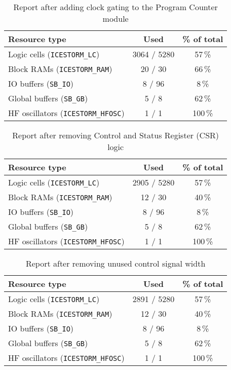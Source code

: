 \documentclass[a4paper,10pt]{article}
\begin{document}
\begin{table}[H] 
    \centering
    \begin{tabularx}{0.65\textwidth}{X c c}
        \toprule
        Resource type & Used & \% of total \\ \midrule
        Logic cells (\texttt{ICESTORM\_LC}) & 3064 / 5280 & 57\,\% \\
        Block RAMs (\texttt{ICESTORM\_RAM}) & 20 / 30 & 66\,\% \\
        IO buffers (\texttt{SB\_IO}) & 8 / 96 & 8\,\% \\
        Global buffers (\texttt{SB\_GB}) & 5 / 8 & 62\,\% \\
        HF oscillators (\texttt{ICESTORM\_HFOSC}) & 1 / 1 & 100\,\% \\
        \bottomrule
    \end{tabularx}
    \caption{Report after adding clock gating to the Program Counter module}
    \label{tab:Program_Counter}
\end{table}

\begin{table}[H] 
    \centering
    \begin{tabularx}{0.65\textwidth}{X c c}
        \toprule
        Resource type & Used & \% of total \\ \midrule
        Logic cells (\texttt{ICESTORM\_LC}) & 2905 / 5280 & 57\,\% \\
        Block RAMs (\texttt{ICESTORM\_RAM}) & 12 / 30 & 40\,\% \\
        IO buffers (\texttt{SB\_IO}) & 8 / 96 & 8\,\% \\
        Global buffers (\texttt{SB\_GB}) & 5 / 8 & 62\,\% \\
        HF oscillators (\texttt{ICESTORM\_HFOSC}) & 1 / 1 & 100\,\% \\
        \bottomrule
    \end{tabularx}
    \caption{Report after removing Control and Status Register (CSR) logic}
    \label{tab:CSR}
\end{table}

\begin{table}[H] 
    \centering
    \begin{tabularx}{0.65\textwidth}{X c c}
        \toprule
        Resource type & Used & \% of total \\ \midrule
        Logic cells (\texttt{ICESTORM\_LC}) & 2891 / 5280 & 57\,\% \\
        Block RAMs (\texttt{ICESTORM\_RAM}) & 12 / 30 & 40\,\% \\
        IO buffers (\texttt{SB\_IO}) & 8 / 96 & 8\,\% \\
        Global buffers (\texttt{SB\_GB}) & 5 / 8 & 62\,\% \\
        HF oscillators (\texttt{ICESTORM\_HFOSC}) & 1 / 1 & 100\,\% \\
        \bottomrule
    \end{tabularx}
    \caption{Report after removing unused control signal width}
    \label{tab:Signal_Width}
\end{table}
\end{document}
